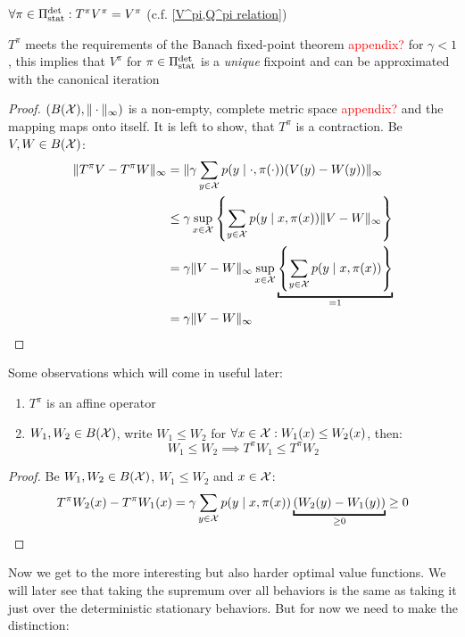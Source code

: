 \begin{remark}
	\(\forall\pi\in\Pi_{\textnormal{stat}}^{\textnormal{det}} : T^\pi V^\pi=V^\pi\) (c.f. \ref{V^pi,Q^pi relation})

	\(T^\pi\) meets the requirements of the Banach fixed-point theorem \textcolor{red}{appendix?} for \({\gamma<1}\), this implies that \(V^\pi\) for \(\pi\in\Pi_{\textnormal{stat}}^{\textnormal{det}}\)
	is a \emph{unique} fixpoint and can be approximated with the canonical iteration
\end{remark}

\begin{proof}
\((B(\mathcal{X}), \|\cdot\|_\infty)\) is a non-empty, complete metric space \textcolor{red}{appendix?} and the mapping maps onto itself. It is left to show, that \(T^\pi\) is a contraction. Be \(V,W\in B(\mathcal{X})\):
\begin{align*}
	\|T^\pi V -T^\pi W\|_\infty &=\|\gamma\sum_{y\in\cX} p(y\mid \cdot,\pi(\cdot)) (V(y)-W(y))\|_\infty\\
	&\le\gamma \sup_{x\in\cX}\left\{ \sum_{y\in\cX} p(y\mid x,\pi(x)) \|V-W\|_\infty \right\}\\
	&=\gamma \|V-W\|_\infty  \sup_{x\in\cX}\underbracket{\left\{ \sum_{y\in\cX} p(y\mid x,\pi(x)) \right\}}_{=1}\\
	&=\gamma \|V-W\|_\infty 
\end{align*}
\end{proof}

\begin{remark}\label{properties T^pi} Some observations which will come in useful later:
	\begin{enumerate}
		\item \(T^\pi\) is an affine operator
		\item \(W_1,W_2\in B(\mathcal{X})\), write \(W_1 \le W_2\) for \(\forall x\in\mathcal{X}:W_1(x)\le W_2(x)\), then:
		\[W_1\le W_2 \implies T^\pi W_1\le T^\pi W_2\]
	\end{enumerate}
\end{remark}

\begin{proof}
 Be \(W_1,W_2\in B(\mathcal{X})\), \(W_1\le W_2\) and \(x\in\mathcal{X}\):
\begin{align*}
	T^\pi W_2 (x) - T^\pi W_1(x) 
	= \gamma \sum_{y\in\cX} p(y\mid x,\pi(x)) \underbracket{(W_2(y)-W_1(y))}_{\ge 0} 
	\ge 0
\end{align*}
\end{proof}

Now we get to the more interesting but also harder optimal value functions. We will later see that taking the supremum over all behaviors is the same as taking it just over the deterministic stationary behaviors. But for now we need to make the distinction:

